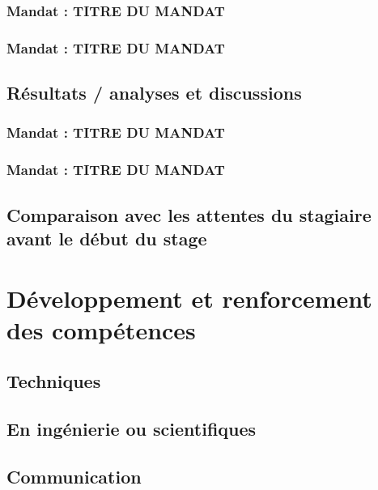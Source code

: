 \documentclass[12pt]{article} 	%
\begin{document}
\subsubsection{Mandat : TITRE DU MANDAT}

\subsubsection{Mandat : TITRE DU MANDAT}

\subsection{Résultats / analyses et discussions}

\subsubsection{Mandat : TITRE DU MANDAT}

\subsubsection{Mandat : TITRE DU MANDAT}

\subsection{Comparaison avec les attentes du stagiaire avant le début du stage}

\newpage
\section{Développement et renforcement des compétences}

\subsection{Techniques}

\subsection{En ingénierie ou scientifiques}

\subsection{Communication}
\end{document}
